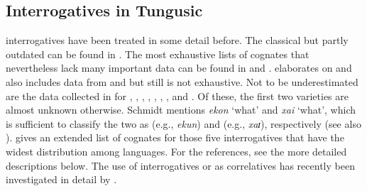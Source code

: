 \subsection{Interrogatives in Tungusic}\label{sec:5.10.3}%

 interrogatives have been treated in some detail before.
The classical but partly outdated  can be found in \cite[114f.]{Benzing1956}. The most exhaustive lists of cognates that nevertheless lack many important data can be found in \cite[264ff.]{Cincius1949} and \cite{Cincius1975/77}. \citet{Kazama2003} elaborates on \cite{Cincius1975/77} and also includes data from  and  but still is not exhaustive. Not to be underestimated are the data collected in \cite{Schmidt1923a,Schmidt1923b,Schmidt1928a,Schmidt1928b} for , , , , , , , and . Of these, the first two varieties are almost unknown otherwise. Schmidt mentions  \textit{ekon} ‘what’ and  \textit{xai} ‘what’, which is sufficient to classify the two as  (e.g.,  \textit{ekun}) and  (e.g.,  \textit{xaɪ}), respectively (see also \citealt{Doerfer1978a}).  gives an extended list of cognates for those five interrogatives that have the widest distribution among  languages. For the references, see the more detailed descriptions below. The use of  interrogatives or  as correlatives has recently been investigated in detail by \citet[185-226]{Baek2016}.

